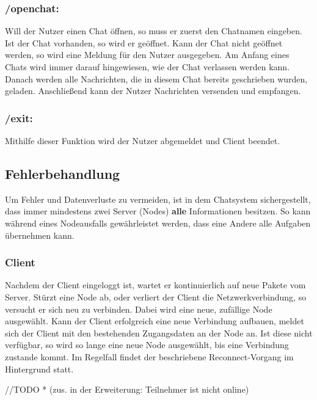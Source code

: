 \subsubsection*{/openchat:}
Will der Nutzer einen Chat öffnen, so muss er zuerst den Chatnamen eingeben. Ist der Chat vorhanden, so wird er geöffnet.
Kann der Chat nicht geöffnet werden, so wird eine Meldung für den Nutzer ausgegeben.
Am Anfang eines Chats wird immer darauf hingewiesen, wie der Chat
verlassen werden kann. Danach werden alle Nachrichten, die in diesem Chat bereits geschrieben wurden, geladen.
Anschließend kann der Nutzer Nachrichten versenden und empfangen.

\subsubsection*{/exit:}
Mithilfe dieser Funktion wird der Nutzer abgemeldet und Client beendet.
\clearpage

\author{Matthias Vonend, Aaron Schweig, Troy Keßler}
\subsection{Fehlerbehandlung}
Um Fehler und Datenverluste zu vermeiden, ist in dem Chatsystem sichergestellt, dass immer mindestens zwei Server (Nodes) \textbf{alle}
Informationen besitzen. So kann während eines Nodeausfalls gewährleistet werden, dass eine Andere alle Aufgaben übernehmen kann.

\subsubsection{Client}
Nachdem der Client eingeloggt ist, wartet er kontinuierlich auf neue Pakete vom Server. Stürzt eine Node ab, oder verliert der Client
die Netzwerkverbindung, so versucht er sich neu zu verbinden. Dabei wird eine neue, zufällige Node ausgewählt.
Kann der Client erfolgreich eine neue Verbindung aufbauen, meldet sich der Client mit den bestehenden Zugangsdaten an der Node an.
Ist diese nicht verfügbar, so wird so lange eine neue Node ausgewählt, bis eine Verbindung zustande kommt.
Im Regelfall findet der beschriebene Reconnect-Vorgang im Hintergrund statt.

//TODO * (zus. in der Erweiterung: Teilnehmer ist nicht online)

